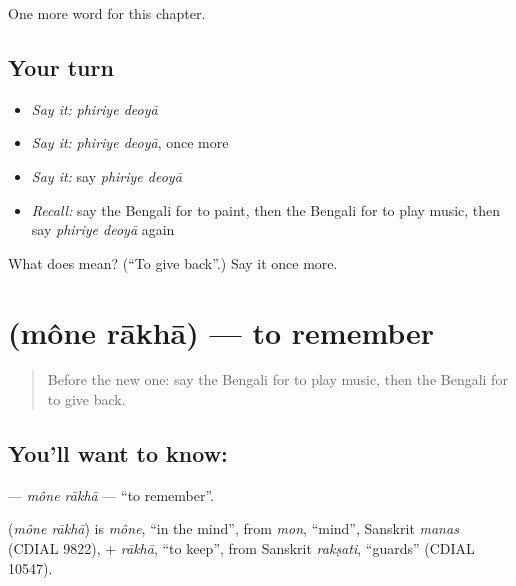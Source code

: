 \begin{grammarlens}[title={What you've built}]
One more word for this chapter.
\end{grammarlens}

\subsection*{Your turn}
\begin{itemize}
\raggedright
  \item \emph{Say it:} \emph{phiriye deoyā}
  \item \emph{Say it:} \emph{phiriye deoyā}, once more
  \item \emph{Say it:} say \emph{phiriye deoyā}
  \item \emph{Recall:} say the Bengali for to paint, then the Bengali for to play music, then say \emph{phiriye deoyā} again
\end{itemize}

\begin{tcolorbox}[breakable,colback=teal!4,colframe=teal!35!black,title={Before you move on}]
What does   mean? (\textquotedblleft{}To give back\textquotedblright{}.) Say it once more.
\end{tcolorbox}
\section[\texorpdfstring{\bn{মনে} \bn{রাখা} (mône rākhā)}{মনে রাখা (mône rākhā)}]{  (mône rākhā) — to remember}

\label{lesson:BN-C239-mone-rakha}



\begin{quote}
Before the new one: say the Bengali for to play music, then the Bengali for to give back.
\end{quote}

\subsection*{You'll want to know:  }
\textbf{ } — \emph{mône rākhā} — \textquotedblleft{}to remember\textquotedblright{}.

\begin{cousinweb}
\textbf{ } (\emph{mône rākhā}) is \emph{mône}, \textquotedblleft{}in the mind\textquotedblright{}, from \emph{mon}, \textquotedblleft{}mind\textquotedblright{}, Sanskrit \emph{manas} (CDIAL 9822), + \emph{rākhā}, \textquotedblleft{}to keep\textquotedblright{}, from Sanskrit \emph{rakṣati}, \textquotedblleft{}guards\textquotedblright{} (CDIAL 10547).
\end{cousinweb}

